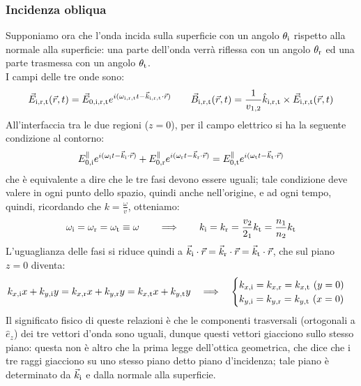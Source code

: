 \subsubsection{Incidenza obliqua}

Supponiamo ora che l'onda incida sulla superficie con un angolo $ \theta_{\text{i}} $ rispetto alla normale alla superficie: una parte dell'onda verrà riflessa con un angolo $ \theta_{\text{r}} $ ed una parte trasmessa con un angolo $ \theta_{\text{t}} $. \\ 
I campi delle tre onde sono:
\begin{equation}
	\vec{E}_{\text{i},\text{r},\text{t}}(\vec{r},t) = \vec{E}_{0,\text{i},\text{r},\text{t}} e^{i(\omega_{\text{i},\text{r},\text{t}} t - \vec{k}_{\text{i},\text{r},\text{t}} \cdot \vec{r})} \qquad \vec{B}_{\text{i},\text{r},\text{t}}(\vec{r},t) = \frac{1}{v_{1,2}} \hat{k}_{\text{i},\text{r},\text{t}} \times \vec{E}_{\text{i},\text{r},\text{t}}(\vec{r},t)
	\label{eq:60}
\end{equation}
All'interfaccia tra le due regioni ($ z = 0 $), per il campo elettrico si ha la seguente condizione al contorno:
\begin{equation}
	E^{\parallel}_{0,\text{i}} e^{i(\omega_{\text{i}} t - \vec{k}_{\text{i}} \cdot \vec{r})} + E^{\parallel}_{0,\text{r}} e^{i(\omega_{\text{r}} t - \vec{k}_{\text{r}} \cdot \vec{r})} = E^{\parallel}_{0,\text{t}} e^{i(\omega_{\text{t}} t - \vec{k}_{\text{t}} \cdot \vec{r})}
	\label{eq:61}
\end{equation}
che è equivalente a dire che le tre fasi devono essere uguali; tale condizione deve valere in ogni punto dello spazio, quindi anche nell'origine, e ad ogni tempo, quindi, ricordando che $ k = \frac{\omega}{v} $, otteniamo:
\begin{equation}
	\omega_{\text{i}} = \omega_{\text{r}} = \omega_{\text{t}} \equiv \omega \qquad\Longrightarrow\qquad k_{\text{i}} = k_{\text{r}} = \frac{v_2}{2_1} k_{\text{t}} = \frac{n_1}{n_2} k_{\text{t}}
	\label{eq:62}
\end{equation}
L'uguaglianza delle fasi si riduce quindi a $ \vec{k}_{\text{i}}\cdot\vec{r} = \vec{k}_{\text{r}}\cdot\vec{r} = \vec{k}_{\text{t}}\cdot\vec{r} $, che sul piano $ z = 0 $ diventa:
\begin{equation}
	k_{x,\text{i}} x + k_{y,\text{i}}  y = k_{x,\text{r}} x + k_{y,\text{r}} y = k_{x,\text{t}} x + k_{y,\text{t}} y \quad\Longrightarrow\quad
	\begin{cases}
		k_{x,\text{i}} = k_{x,\text{r}} = k_{x,\text{t}} \,\,(y = 0) \\ 
		k_{y,\text{i}} = k_{y,\text{r}} = k_{y,\text{t}} \,\,(x = 0)
	\end{cases}
	\label{eq:63}
\end{equation}
Il significato fisico di queste relazioni è che le componenti trasversali (ortogonali a $ \hat{e}_z $) dei tre vettori d'onda sono uguali, dunque questi vettori giacciono sullo stesso piano: questa non è altro che la prima legge dell'ottica geometrica, che dice che i tre raggi giacciono su uno stesso piano detto piano d'incidenza; tale piano è determinato da $ \vec{k}_{\text{i}} $ e dalla normale alla superficie. \\ 
